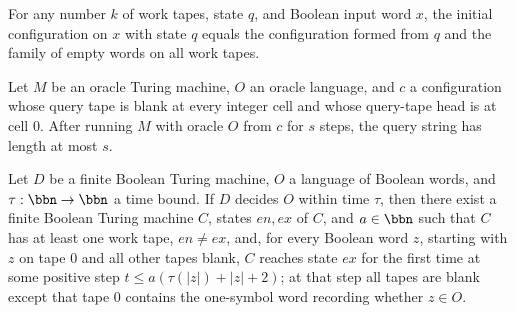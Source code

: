 \begin{theorem}
\label{Turing.Cfg.init_eq_ofWords}
\leanok
{}
For any number $k$ of work tapes, state $q$, and Boolean input word $x$, the initial
configuration on $x$ with state $q$ equals the configuration formed from $q$ and the
family of empty words on all work tapes.
\end{theorem}

\begin{theorem}
\label{Turing.OracleTM.queryString_runFrom_length_le_of_blank}
\leanok
{}
Let $M$ be an oracle Turing machine, $O$ an oracle language, and $c$ a configuration
whose query tape is blank at every integer cell and whose query-tape head is at cell
$0$. After running $M$ with oracle $O$ from $c$ for $s$ steps, the query string has
length at most $s$.
\end{theorem}

\begin{theorem}
\label{Turing.oracleInstallCall}
\leanok
{}
Let $D$ be a finite Boolean Turing machine, $O$ a language of Boolean words, and
$\tau:\bbn\to\bbn$ a time bound. If $D$ decides $O$ within time $\tau$, then there exist
a finite Boolean Turing machine $C$, states $en,ex$ of $C$, and $a\in\bbn$ such that $C$
has at least one work tape, $en\ne ex$, and, for every Boolean word $z$, starting with
$z$ on tape $0$ and all other tapes blank, $C$ reaches state $ex$ for the first time at
some positive step $t\le a(\tau(|z|)+|z|+2)$; at that step all tapes are blank except
that tape $0$ contains the one-symbol word recording whether $z\in O$.
\end{theorem}

